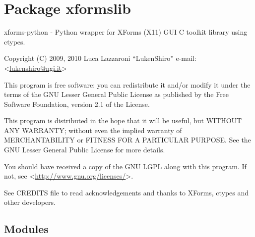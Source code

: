%
%
%


\section{Package xformslib}

    \label{xformslib}

xforms-python - Python wrapper for XForms (X11) GUI C toolkit library
using ctypes.

Copyright (C) 2009, 2010  Luca Lazzaroni ``LukenShiro''
e-mail: <\href{mailto:lukenshiro@ngi.it}{lukenshiro@ngi.it}>

This program is free software: you can redistribute it and/or modify
it under the terms of the GNU Lesser General Public License as
published by the Free Software Foundation, version 2.1 of the License.

This program is distributed in the hope that it will be useful,
but WITHOUT ANY WARRANTY; without even the implied warranty of
MERCHANTABILITY or FITNESS FOR A PARTICULAR PURPOSE. See the
GNU Lesser General Public License for more details.

You should have received a copy of the GNU LGPL along with this
program. If not, see <\href{http://www.gnu.org/licenses/}{http://www.gnu.org/licenses/}>.

See CREDITS file to read acknowledgements and thanks to XForms,
ctypes and other developers.


\subsection{Modules}

